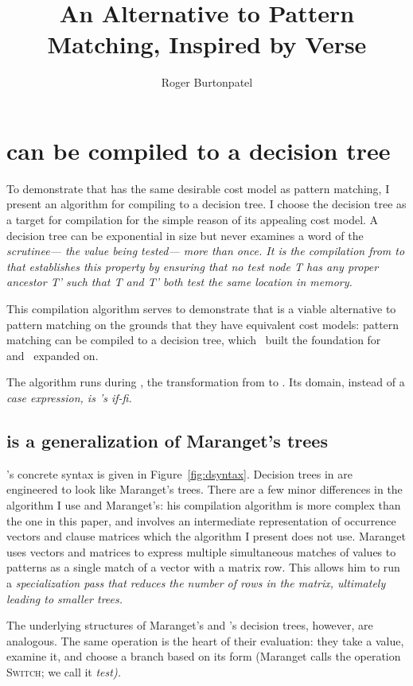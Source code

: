 \documentclass[manuscript,screen,review, 12pt, nonacm]{acmart}
\title{An Alternative to Pattern Matching, Inspired by Verse}
\author{Roger Burtonpatel}
\affiliation{%
\institution{Tufts University}
\streetaddress{419 Boston Ave}
  \city{Medford}
  \state{Massachusetts}
  \country{USA}
  \postcode{02155}
  }
\begin{document}
  

\section{\VMinus can be compiled to a decision tree}
\label{vminustod}
    To demonstrate that \VMinus has the same desirable cost model as pattern
    matching, I present an algorithm for compiling \VMinus to a decision tree. I
    choose the decision tree as a target for compilation for the simple reason
    of its appealing cost model. A decision tree can be exponential in size but
    never examines a word of the \it{scrutinee}--- the value being tested---
    more than once. It is the compilation from \VMinus to \D that establishes
    this property by ensuring that no \it{test} node \it{T} has any proper
    ancestor \it{T'} such that \it{T} and \it{T'} both test the same location in
    memory.   

    This compilation algorithm serves to demonstrate that \VMinus is a viable
    alternative to pattern matching on the grounds that they have equivalent
    cost models: pattern matching can be compiled to a decision tree,
    which~\citet{macqueen1985tree} built the foundation for and~\citet{maranget}
    expanded on. 

    The algorithm runs during \DTran, the transformation from \VMinus to \D. Its
    domain, instead of a \it{case} expression, is \VMinus's \it{if-fi}. 
       
    \subsection{\D is a generalization of Maranget's trees} 

  \D's concrete syntax is given in Figure~\ref{fig:dsyntax}. Decision trees in \D
    are engineered to look like Maranget's trees. There are a few minor
    differences in the algorithm I use and Maranget's: his compilation algorithm
    is more complex than the one in this paper, and involves an intermediate
    representation of occurrence vectors and clause matrices which the algorithm
    I present does not use. Maranget uses vectors and matrices to express
    multiple simultaneous matches of values to patterns as a single match of a
    vector with a matrix row. This allows him to run a \it{specialization} pass
    that reduces the number of rows in the matrix, ultimately leading to smaller
    trees.
    
        
    The underlying structures of Maranget's and \D's decision trees, however,
    are analogous. The same operation is the heart of their evaluation: they
    take a value, examine it, and choose a branch based on its form (Maranget
    calls the operation \textsc{Switch}; we call it \it{test}). 
\end{document}
